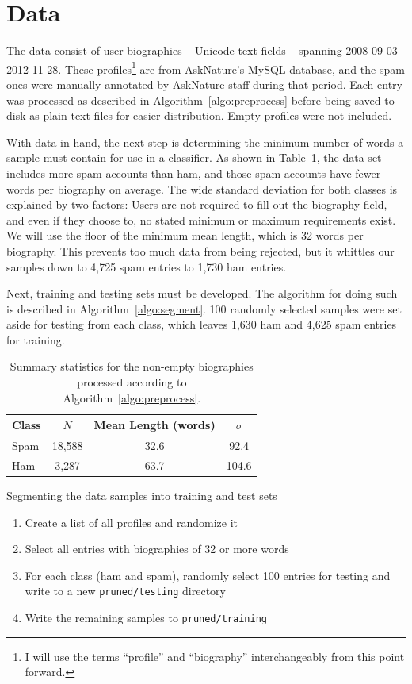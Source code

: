 \documentclass[10pt]{article}
\begin{document}
\section{Data}
The data consist of user biographies -- Unicode text fields -- spanning
2008-09-03--2012-11-28. These profiles\footnote{I will use the terms
  ``profile'' and ``biography'' interchangeably from this point forward.} are
from AskNature's MySQL database, and the spam ones were manually annotated by
AskNature staff during that period. Each entry was processed as described in
Algorithm~\ref{algo:preprocess} before being saved to disk as plain text files
for easier distribution. Empty profiles were not included.

With data in hand, the next step is determining the minimum number of words a
sample must contain for use in a classifier. As shown in
Table~\ref{table:corpus-stats}, the data set includes more spam accounts than
ham, and those spam accounts have fewer words per biography on average. The
wide standard deviation for both classes is explained by two factors: Users
are not required to fill out the biography field, and even if they choose to,
no stated minimum or maximum requirements exist. We will use the floor of the
minimum mean length, which is 32 words per biography. This prevents too much
data from being rejected, but it whittles our samples down to 4,725 spam
entries to 1,730 ham entries.

Next, training and testing sets must be developed. The algorithm for doing
such is described in Algorithm~\ref{algo:segment}. 100 randomly selected
samples were set aside for testing from each class, which leaves 1,630 ham and
4,625 spam entries for training.

\begin{table}
  \centering
  \caption{Summary statistics for the non-empty biographies processed
    according to Algorithm~\ref{algo:preprocess}.}
  \label{table:corpus-stats}
  \begin{tabular}{lccc}
    \toprule
    Class & $N$ & Mean Length (words) & $\sigma$\\ \midrule
    Spam  & 18,588 & 32.6 & 92.4 \\
    Ham   & 3,287  & 63.7 & 104.6 \\
    \bottomrule
  \end{tabular}
\end{table}

\begin{algorithm}
  \caption{Segmenting the data samples into training and test sets}
  \label{algo:segment}
  \begin{enumerate}
  \item Create a list of all profiles and randomize it
  \item Select all entries with biographies of 32 or more words
  \item For each class (ham and spam), randomly select 100 entries for testing
    and write to a new \texttt{pruned/testing} directory
  \item Write the remaining samples to \texttt{pruned/training}
  \end{enumerate}
\end{algorithm}
\end{document}
